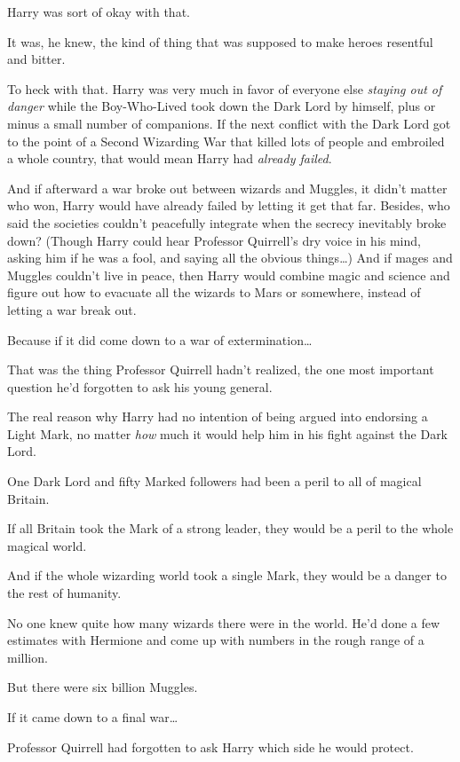 Harry was sort of okay with that.

It was, he knew, the kind of thing that was supposed to make heroes resentful 
and bitter.

To heck with that. Harry was very much in favor of everyone else \emph{staying 
out of danger} while the Boy-Who-Lived took down the Dark Lord by himself, plus 
or minus a small number of companions. If the next conflict with the Dark Lord 
got to the point of a Second Wizarding War that killed lots of people and 
embroiled a whole country, that would mean Harry had \emph{already failed}.

And if afterward a war broke out between wizards and Muggles, it didn't matter 
who won, Harry would have already failed by letting it get that far. Besides, 
who said the societies couldn't peacefully integrate when the secrecy 
inevitably broke down? (Though Harry could hear Professor Quirrell's dry voice 
in his mind, asking him if he was a fool, and saying all the obvious 
things{\ldots}) And if mages and Muggles couldn't live in peace, then Harry 
would combine magic and science and figure out how to evacuate all the wizards 
to Mars or somewhere, instead of letting a war break out.

Because if it did come down to a war of extermination{\ldots}

That was the thing Professor Quirrell hadn't realized, the one most important 
question he'd forgotten to ask his young general.

The real reason why Harry had no intention of being argued into endorsing a 
Light Mark, no matter \emph{how} much it would help him in his fight against 
the Dark Lord.

One Dark Lord and fifty Marked followers had been a peril to all of magical 
Britain.

If all Britain took the Mark of a strong leader, they would be a peril to the 
whole magical world.

And if the whole wizarding world took a single Mark, they would be a danger to 
the rest of humanity.

No one knew quite how many wizards there were in the world. He'd done a few 
estimates with Hermione and come up with numbers in the rough range of a 
million.

But there were six billion Muggles.

If it came down to a final war{\ldots}

Professor Quirrell had forgotten to ask Harry which side he would protect.

